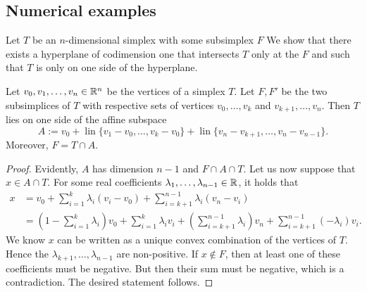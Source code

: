 \documentclass[12pt,a4paper]{article}
\begin{document}
\subsection{Numerical examples}



Let $T$ be an $n$-dimensional simplex with some subsimplex $F$ We show that there exists a hyperplane of codimension one that intersects $T$ only at the $F$ and such that $T$ is only on one side of the hyperplane. 

\begin{lemma}\label{lemma:oppositesubsimplex}
    Let $v_0, v_1, \dots, v_n \in {\mathbb R}^n$ be the vertices of a simplex $T$.
    Let $F, F'$ be the two subsimplices of $T$ with respective sets of vertices $v_0,\dots,v_k$ and $v_{k+1},\dots,v_n$.
    Then $T$ lies on one side of the affine subspace
    \[
        A := v_0 + \operatorname{lin}\{ v_1 - v_0, \dots, v_k - v_0 \} +  \operatorname{lin}\{ v_n - v_{k+1}, \dots, v_n - v_{n-1} \}.
    \]
    Moreover, $F = T \cap A$.
\end{lemma}
\begin{proof}
    Evidently, $A$ has dimension $n-1$ and $F \cap A \cap T$.
    Let us now suppose that $x \in A \cap T$.
    For some real coefficients $\lambda_1,\dots,\lambda_{n-1} \in {\mathbb R}$, it holds that 
    \begin{align}
        x 
        &
        = 
        v_0 + \sum_{i=1}^{k} \lambda_{i} ( v_i - v_0 ) + \sum_{i=k+1}^{n-1} \lambda_{i} ( v_n - v_i )
        \\&
        = 
        \left( 1 - \sum_{i=1}^{k} \lambda_{i} \right) v_0 
        + 
        \sum_{i=1  }^{k  } \lambda_{i} v_i 
        + 
        \left( \sum_{i=k+1}^{n-1} \lambda_{i} \right) v_n
        + 
        \sum_{i=k+1}^{n-1} (-\lambda_{i}) v_i 
        .
    \end{align}
    We know $x$ can be written as a unique convex combination of the vertices of $T$.
    Hence the $\lambda_{k+1}, \dots, \lambda_{n-1}$ are non-positive. 
    If $x \notin F$, then at least one of these coefficients must be negative. 
    But then their sum must be negative, which is a contradiction. 
    The desired statement follows.         
\end{proof}
\end{document}
